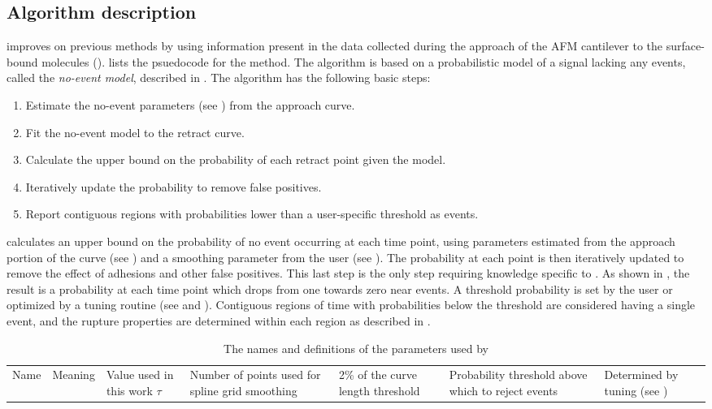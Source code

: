 \subsection{Algorithm description}

\name{} improves on previous methods by using information present in the data collected during the approach of the AFM cantilever to the surface-bound molecules ().   lists the psuedocode for the method. The algorithm is based on a probabilistic model of a signal lacking any events, called the \textit{no-event model}, described in . The algorithm has the following basic steps:

\begin{enumerate}
\item Estimate the no-event parameters (see ) from the approach curve.
\item Fit the no-event model to the retract curve.
\item Calculate the upper bound on the probability of each retract point given the model.
\item Iteratively update the probability to remove false positives.
\item Report contiguous regions with probabilities lower than a user-specific threshold as events.
\end{enumerate}

 \name{} calculates an upper bound on the probability of no event occurring at each time point, using parameters estimated from the approach portion of the curve (see ) and a smoothing parameter from the user (see ). The probability at each point is then iteratively updated to remove the effect of adhesions and other false positives. This last step is the only step requiring knowledge specific to \singlemol{}. As shown in , the result is a probability at each time point which drops from one towards zero near events. A threshold probability is set by the user or optimized by a tuning routine (see  and ). Contiguous regions of time with probabilities below the threshold are considered having a single event, and the rupture properties are determined within each region as described in .


\begin{table}
\caption[Algorithm parameters]{ The names and definitions of the parameters used by \name{}}
\begin{tabularx}{\textwidth}{ l | l | l | l  }
\hline \hline
Name & Meaning  & Value used in this work \e
$\tau$ & Number of points used for spline grid smoothing & 2\% of the curve length \e
threshold & Probability threshold above which to reject events  & Determined by tuning (see ) \e
\end{tabularx}
\end{table}


